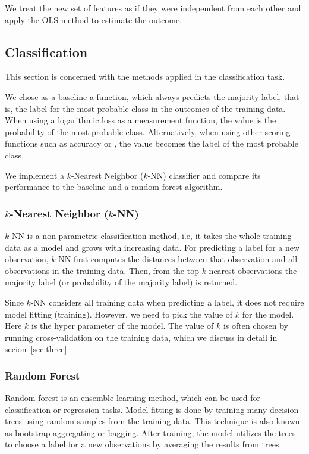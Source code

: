 We treat the new set of features as if they were independent from each other
and apply the OLS method to estimate the outcome.

\subsection{Classification}

This section is concerned with the methods applied in the classification task.

We chose as a baseline a function, which always predicts the majority label,
that is, the label for the most probable class in the outcomes of the training
data.  When using a logarithmic loss as a measurement function, the value is the
probability of the most probable class.  Alternatively, when using other scoring
functions such as accuracy or \fmeasure, the value becomes the label of the most
probable class.

We implement a $k$-Nearest Neighbor ($k$-NN) classifier and compare its
performance to the baseline and a random forest algorithm.

\subsubsection{$k$-Nearest Neighbor ($k$-NN)}

$k$-NN is a non-parametric classification method, i.e, it takes the whole
training data as a model and grows with increasing data.  For predicting a label
for a new observation, $k$-NN first computes the distances between that
observation and all observations in the training data.  Then, from the top-$k$
nearest observations the majority label (or probability of the majority label)
is returned.

Since $k$-NN considers all training data when predicting a label, it does not
require model fitting (training).  However, we need to pick the value of $k$ for
the model.  Here $k$ is the hyper parameter of the model.  The value of $k$ is
often chosen by running cross-validation on the training data, which we discuss
in detail in secion~\ref{sec:three}.

\subsubsection{Random Forest}

Random forest\cite{DBLP:journals/ml/Breiman01} is an ensemble learning method, which can be used for
classification or regression tasks.  Model fitting is done by training many
decision trees using random samples from the training data.  This technique is
also known as bootstrap aggregating or bagging.  After training, the model
utilizes the trees to choose a label for a new observations by averaging the
results from trees.

